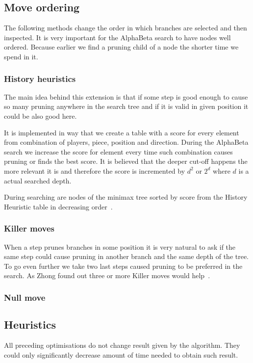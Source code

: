 \subsection{Move ordering}
The following methods change the order in which branches are selected and then
inspected. It is very important for the AlphaBeta search to have nodes well
ordered. Because earlier we find a pruning child of a node the shorter time
we spend in it.

	\subsubsection{History heuristics}
	The main idea behind this extension is that if some step is good enough
	to cause so many pruning anywhere in the search tree and if it is valid in
	given position it could be also good here.

	It is implemented in way that we create a table with a score for every
	element from combination of players, piece, position and direction. During
	the AlphaBeta search we increase the score for element every time such
	combination causes pruning or finds the best score. It is believed that
	the deeper cut-off happens the more relevant it is and therefore the score
	is incremented by $d^2$ or $2^d$ where $d$ is a actual searched depth.

	During searching are nodes of the minimax tree sorted by score from the
	History Heuristic table in decreasing order~\cite{COX}.

	\subsubsection{Killer moves}
	When a step prunes branches in some position it is very natural to ask if
	the same step could cause pruning in another branch and the same depth of
	the tree. To go even further we take two last steps caused pruning to be
	preferred in the search. As Zhong found out three or more Killer moves would help~\cite{ZHONG}.

	\subsubsection{Null move}


\subsection{Heuristics}
All preceding optimisations do not change result given by the algorithm. They
could only significantly decrease amount of time needed to obtain such result.

